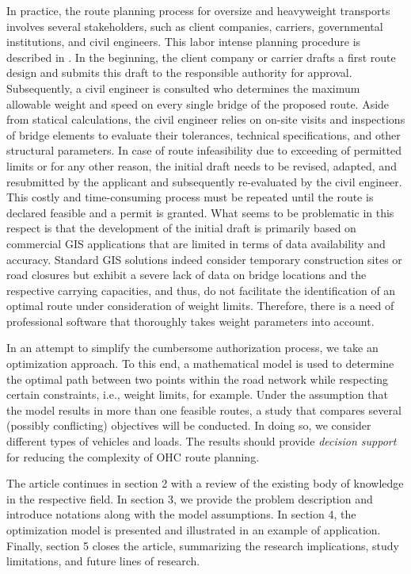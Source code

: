 \par In practice, the route planning process for oversize and heavyweight transports involves several stakeholders, such as client companies, carriers, governmental institutions, and civil engineers.
This labor intense planning procedure is described in \cite{Osegueda.1999}. In the beginning, the client company or carrier drafts a first route design and submits this draft to the responsible authority for approval.
Subsequently, a civil engineer is consulted who determines the maximum allowable weight and speed on every single bridge of the proposed route.
Aside from statical calculations, the civil engineer relies on on-site visits and inspections of bridge elements to evaluate their tolerances, technical specifications, and other structural parameters.
In case of route infeasibility due to exceeding of permitted limits or for any other reason, the initial draft needs to be revised, adapted, and resubmitted by the applicant and subsequently re-evaluated by the civil engineer.
This costly and time-consuming process must be repeated until the route is declared feasible and a permit is granted.
What seems to be problematic in this respect is that the development of the initial draft is primarily based on commercial GIS applications that are limited in terms of data availability and accuracy.
Standard GIS solutions indeed consider temporary construction sites or road closures but exhibit a severe lack of data on bridge locations and the respective carrying capacities, and thus, do not facilitate the identification of an optimal route under consideration of weight limits.
Therefore, there is a need of professional software that thoroughly takes weight parameters into account.
\par In an attempt to simplify the cumbersome authorization process, we take an optimization approach.
To this end, a mathematical model is used to determine the optimal path between two points within the road network while respecting certain constraints, i.e., weight limits, for example.
Under the assumption that the model results in more than one feasible routes, a study that compares several (possibly conflicting) objectives will be conducted.
In doing so, we consider different types of vehicles and loads. The results should provide \textit{decision support} for reducing the complexity of OHC route planning. 
\par
The article continues in section 2 with a review of the existing body of knowledge in the respective field.
In section 3, we provide the problem description and introduce notations along with the model assumptions. In section 4, the optimization model is presented and illustrated in an example of application.
Finally, section 5 closes the article, summarizing the research implications, study limitations, and future lines of research.
